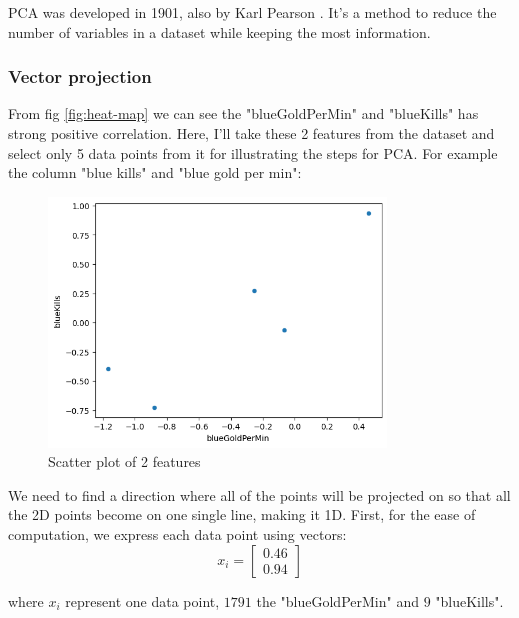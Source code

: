 \documentclass[stu,12pt,floatsintext]{apa7}
\begin{document}
PCA was developed in 1901, also by Karl Pearson \parencite{pearson-pca}. It's a method to reduce the number of variables in a dataset while keeping the most information.

\subsubsection{Vector projection}

From fig \ref{fig:heat-map} we can see the "blueGoldPerMin" and "blueKills" has strong positive correlation. Here, I'll take these 2 features from the dataset and select only 5 data points from it for illustrating the steps for PCA. For example the column "blue kills" and "blue gold per min":

\begin{figure}[h]
    \centering
    \includegraphics[width=0.8\textwidth]{images/feature-scatter.png}
    \caption{Scatter plot of 2 features}
    \label{fig:feature-scatter}
\end{figure}

We need to find a direction where all of the points will be projected on so that all the 2D points become on one single line, making it 1D. First, for the ease of computation, we express each data point using vectors: 
\begin{equation}
    x_i=
    \begin{bmatrix}
    0.46\\
    0.94
    \end{bmatrix}
\end{equation}

where $x_i$ represent one data point, $1791$ the "blueGoldPerMin" and $9$ "blueKills".
\end{document}
